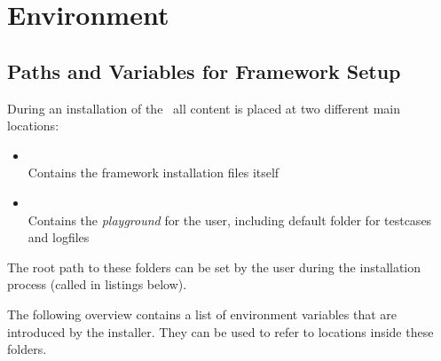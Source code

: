 %
%
%

\chapter{Environment}

\section{Paths and Variables for Framework Setup}
During an installation of the \rfw\ all content is placed at two different main locations:

\begin{itemize}
   \item {}\\
         Contains the framework installation files itself
   \item {}\\
         Contains the \textit{playground} for the user, including default folder for testcases and logfiles
\end{itemize}

The root path to these folders can be set by the user during the installation process (called  in listings below).

The following overview contains a list of environment variables that are introduced by the installer. They can be used
to refer to locations inside these folders.

